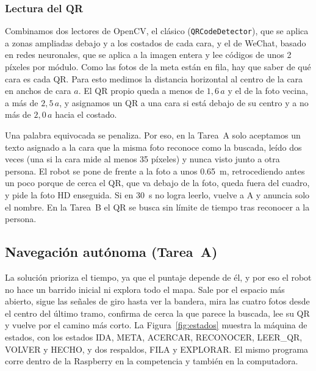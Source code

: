 \documentclass[11pt,a4paper]{article}
\begin{document}
\subsubsection{Lectura del QR}

Combinamos dos lectores de OpenCV, el clásico (\texttt{QRCodeDetector}), que se aplica a zonas ampliadas debajo y a los costados de cada cara, y el de WeChat, basado en redes neuronales, que se aplica a la imagen entera y lee códigos de unos 2 píxeles por módulo. Como las fotos de la meta están en fila, hay que saber de qué cara es cada QR. Para esto medimos la distancia horizontal al centro de la cara en anchos de cara $a$. El QR propio queda a menos de $1{,}6\,a$ y el de la foto vecina, a más de $2{,}5\,a$, y asignamos un QR a una cara si está debajo de su centro y a no más de $2{,}0\,a$ hacia el costado.

Una palabra equivocada se penaliza. Por eso, en la Tarea~A solo aceptamos un texto asignado a la cara que la misma foto reconoce como la buscada, leído dos veces (una si la cara mide al menos 35 píxeles) y nunca visto junto a otra persona. El robot se pone de frente a la foto a unos \SI{0,65}{\meter}, retrocediendo antes un poco porque de cerca el QR, que va debajo de la foto, queda fuera del cuadro, y pide la foto HD enseguida. Si en \SI{30}{\second} no logra leerlo, vuelve a A y anuncia solo el nombre. En la Tarea~B el QR se busca sin límite de tiempo tras reconocer a la persona.

\subsection{Navegación autónoma (Tarea~A)}

La solución prioriza el tiempo, ya que el puntaje depende de él, y por eso el robot no hace un barrido inicial ni explora todo el mapa. Sale por el espacio más abierto, sigue las señales de giro hasta ver la bandera, mira las cuatro fotos desde el centro del último tramo, confirma de cerca la que parece la buscada, lee su QR y vuelve por el camino más corto. La Figura~\ref{fig:estados} muestra la máquina de estados, con los estados IDA, META, ACERCAR, RECONOCER, LEER\_QR, VOLVER y HECHO, y dos respaldos, FILA y EXPLORAR. El mismo programa corre dentro de la Raspberry en la competencia y también en la computadora.
\end{document}
